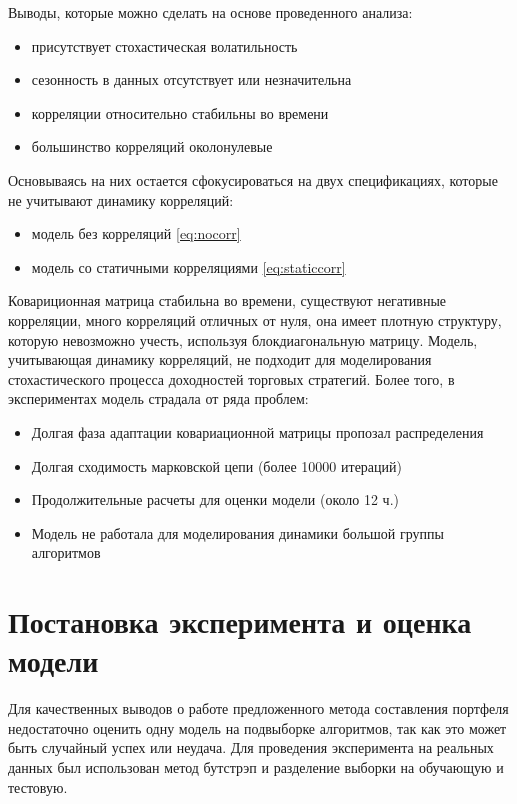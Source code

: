 Выводы, которые можно сделать на основе проведенного анализа:
\begin{itemize}
	\item присутствует стохастическая волатильность
	\item сезонность в данных отсутствует или незначительна
	\item корреляции относительно стабильны во времени
	\item большинство корреляций околонулевые
\end{itemize}

Основываясь на них остается сфокусироваться на двух спецификациях, которые не учитывают динамику корреляций:
\begin{itemize}
	\item модель без корреляций \eqref{eq:nocorr}
	\item модель со статичными корреляциями \eqref{eq:staticcorr}
\end{itemize}

Ковариционная матрица стабильна во времени, существуют негативные корреляции, много корреляций отличных от нуля, она имеет плотную структуру, которую невозможно учесть, используя блокдиагональную матрицу. Модель, учитывающая динамику корреляций, не подходит для моделирования стохастического процесса доходностей торговых стратегий. Более того, в экспериментах модель страдала от ряда проблем:
\begin{itemize}
	\item Долгая фаза адаптации ковариационной матрицы пропозал распределения
	\item Долгая сходимость марковской цепи (более 10000 итераций)
	\item Продолжительные расчеты для оценки модели (около 12 ч.)
	\item Модель не работала для моделирования динамики большой группы алгоритмов
\end{itemize}

\section{Постановка эксперимента и оценка модели}
Для качественных выводов о работе предложенного метода составления портфеля недостаточно оценить одну модель на подвыборке алгоритмов, так как это может быть случайный успех или неудача. Для проведения эксперимента на реальных данных был использован метод бутстрэп \citep{grimshaw1995} и разделение выборки на обучающую и тестовую. 

